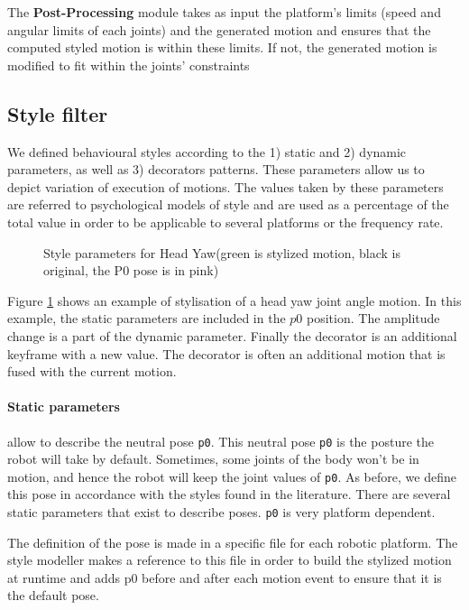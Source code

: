 \documentclass[a4paper,twocolumn]{svjour3}
\begin{document}
The \textbf{Post-Processing} module takes as input the platform's limits (speed and angular limits of each joints) and the generated motion and ensures that the computed styled motion is within these limits.
If not, the generated motion is modified to fit within the joints' constraints


\subsection{Style filter}
\label{ssec:bss}
We defined behavioural styles according to the 1) static and 2) dynamic parameters, as well as 3) decorators patterns. 
These parameters allow us to depict variation of execution of motions.
The values taken by these parameters are referred to psychological models of style and are used as a percentage of the total value in order to be applicable to several platforms or the frequency rate.
\begin{figure}
	\centering
	\caption{Style parameters for Head Yaw(green is stylized motion, black is original, the P0 pose is in pink)}
	\label{fig:styles_parameters}
\end{figure}
Figure \ref{fig:styles_parameters} shows an example of stylisation of a head yaw joint angle motion.
In this example, the static parameters are included in the $p0$ position.
The amplitude change is a part of the dynamic parameter. 
Finally the decorator is an additional keyframe with a new value. 
The decorator is often an additional motion that is fused with the current motion.

\paragraph{Static parameters} allow to describe the neutral pose \texttt{p0}. 
This neutral pose \texttt{p0} is the posture the robot will take by default.
Sometimes, some joints of the body won't be in motion,  and hence the robot will keep the joint values of \texttt{p0}.
As before, we define this pose in accordance with the styles found in the literature. 
There are several static parameters that exist to describe poses. 
\texttt{p0} is very platform dependent. 

The definition of the pose is made in a specific file for each robotic platform. 
The style modeller makes a reference to this file in order to build the stylized motion at runtime and adds p0 before and after each motion event to ensure that it is the default pose.
\end{document}
